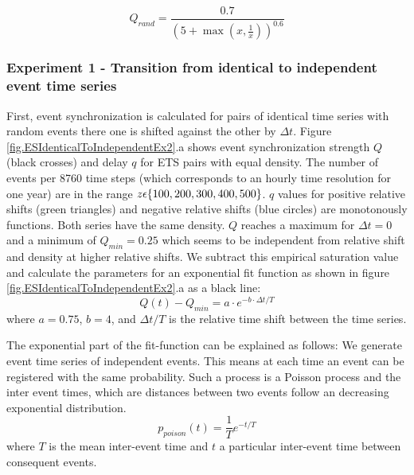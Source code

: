 \documentclass[a4paper,10pt]{scrbook}
\begin{document}
\begin{equation}
Q_{rand}=\frac{0.7}{\left(5+\max \left(x,\frac{1}{x}\right)\right)^{0.6}}
\label{eqn:cal_fit}
\end{equation}

\subsubsection*{Experiment 1 - Transition from identical to independent event time series}

First, event synchronization is calculated for pairs of identical time series with random events there one is shifted against the other by $\Delta t$. Figure \ref{fig.ESIdenticalToIndependentEx2}.a shows event synchronization strength $Q$ (black crosses) and delay $q$ for ETS pairs with equal density. The number of events per 8760 time steps (which corresponds to an hourly time resolution for one year) are in the range $z \rm \epsilon \lbrace 100, 200, 300, 400, 500 \rbrace $. $q$ values for positive relative shifts (green triangles) and negative relative shifts (blue circles) are monotonously functions. Both series have the same density. $Q$ reaches a maximum for $\Delta t = 0$ and a minimum of $Q_{min} = 0.25$ which seems to be independent from relative shift and density at higher relative shifts. We subtract this empirical saturation value and calculate the parameters for an exponential fit function as shown in figure \ref{fig.ESIdenticalToIndependentEx2}.a as a black line:
\begin{equation}
Q(t) - Q_{min} = a \cdot e^{- b \cdot \Delta t/T}  
\label{eqn:ES_shift_fit}
\end{equation}
where $a=0.75$, $b=4$, and $\Delta t/T$ is the relative time shift between the time series.

The exponential part of the fit-function can be explained as follows: We generate event time series of independent events. This means at each time an event can be registered with the same probability. Such a process is a Poisson process and the inter event times, which are distances between two events follow an decreasing exponential distribution. 
\begin{equation}
p_{poison}( t ) = \frac{1}{T}e^{- t /T}
\label{eq:expdist}
\end{equation}
where $T$ is the mean inter-event time and $t$ a particular inter-event time between consequent events.
\end{document}
